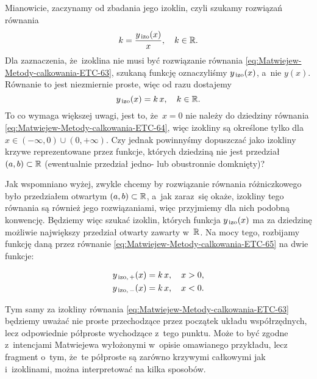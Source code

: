 \documentclass[a4paper,11pt]{article}
\numberwithin{equation}{section}
\begin{document}
Mianowicie, zaczynamy od zbadania jego izoklin, czyli szukamy rozwiązań
równania
\begin{equation}
  \label{eq:Matwiejew-Metody-calkowania-ETC-64}
  k = \frac{ y_{ \, \textrm{izo} }( x ) }{ x }, \quad
  k \in \mathbb{R}.
\end{equation}
Dla zaznaczenia, że~izoklina nie musi być rozwiązanie równania
\eqref{eq:Matwiejew-Metody-calkowania-ETC-63}, szukaną funkcję oznaczyliśmy
$y_{ \, \textrm{izo} }( x )$, a~nie $y( x )$. Równanie to jest niezmiernie proste,
więc od razu dostajemy
\begin{equation}
  \label{eq:Matwiejew-Metody-calkowania-ETC-65}
  y_{ \, \textrm{izo} }( x ) = k \, x, \quad
  k \in \mathbb{R}.
\end{equation}
To co wymaga większej uwagi, jest to, że~$x = 0$ nie należy do dziedziny
równania \eqref{eq:Matwiejew-Metody-calkowania-ETC-64}, więc izokliny są
określone tylko dla $x \in ( -\infty, 0 ) \cup ( 0, +\infty )$. Czy jednak powinnyśmy
dopuszczać jako izokliny krzywe reprezentowane przez funkcje, których
dziedziną nie jest przedział $( a, b ) \subset \mathbb{R}$ (ewentualnie przedział
jedno- lub obustronnie domknięty)?

Jak wspomniano wyżej, zwykle chcemy by rozwiązanie równania różniczkowego
było przedziałem otwartym $( a, b ) \subset \mathbb{R}$, a~jak zaraz~się okaże,
izokliny tego równania są również jego rozwiązaniami, więc przyjmiemy dla
nich podobną konwencję. Będziemy więc szukać izoklin, których funkcja
$y_{ \, \textrm{izo} }( x )$ ma za dziedzinę możliwie największy przedział otwarty
zawarty w~$\mathbb{R}$. Na mocy tego, rozbijamy funkcję daną przez równanie
\eqref{eq:Matwiejew-Metody-calkowania-ETC-65} na dwie funkcje:

\negVerSpaceFour


\begin{subequations}

  \begin{align}
    \label{eq:Matwiejew-Metody-calkowania-ETC-66-A}
    y_{ \, \textrm{izo}, \, + }( x )
    &=
      k \, x, \quad
      x > 0, \\
    \label{eq:Matwiejew-Metody-calkowania-ETC-66-B}
    y_{ \, \textrm{izo}, \, - }( x )
    &=
      k \, x, \quad
      x < 0.
  \end{align}

\end{subequations}


\noindent
Tym samy za izokliny równania \eqref{eq:Matwiejew-Metody-calkowania-ETC-63}
będziemy uważać nie proste przechodzące przez początek układu
współrzędnych, lecz odpowiednie półproste wychodzące z~tego punktu. Może to
być zgodne z~intencjami Matwiejewa wyłożonymi w~opisie omawianego
przykładu, lecz fragment o~tym, że~te półproste są zarówno krzywymi
całkowymi jak i~izoklinami, można interpretować na kilka sposobów.
\end{document}
